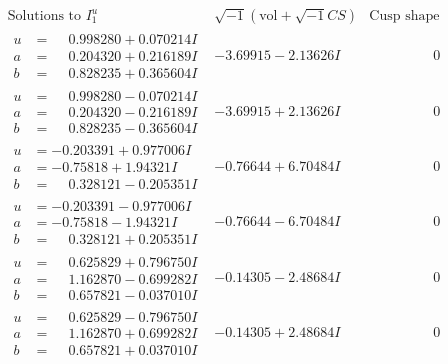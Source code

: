 \documentclass[1p]{elsarticle_modified}
\theoremstyle{definition}
\newcommand{\I}{\sqrt{-1}}
\begin{document}
$$\begin{array}{c|c|c}  
\text{Solutions to }I^u_{1}& \I (\text{vol} + \sqrt{-1}CS) & \text{Cusp shape}\\
 \hline 
\begin{aligned}
u &= \phantom{-}0.998280 + 0.070214 I \\
a &= \phantom{-}0.204320 + 0.216189 I \\
b &= \phantom{-}0.828235 + 0.365604 I\end{aligned}
 & -3.69915 - 2.13626 I & \phantom{-0.000000 } 0 \\ \hline\begin{aligned}
u &= \phantom{-}0.998280 - 0.070214 I \\
a &= \phantom{-}0.204320 - 0.216189 I \\
b &= \phantom{-}0.828235 - 0.365604 I\end{aligned}
 & -3.69915 + 2.13626 I & \phantom{-0.000000 } 0 \\ \hline\begin{aligned}
u &= -0.203391 + 0.977006 I \\
a &= -0.75818 + 1.94321 I \\
b &= \phantom{-}0.328121 - 0.205351 I\end{aligned}
 & -0.76644 + 6.70484 I & \phantom{-0.000000 } 0 \\ \hline\begin{aligned}
u &= -0.203391 - 0.977006 I \\
a &= -0.75818 - 1.94321 I \\
b &= \phantom{-}0.328121 + 0.205351 I\end{aligned}
 & -0.76644 - 6.70484 I & \phantom{-0.000000 } 0 \\ \hline\begin{aligned}
u &= \phantom{-}0.625829 + 0.796750 I \\
a &= \phantom{-}1.162870 - 0.699282 I \\
b &= \phantom{-}0.657821 - 0.037010 I\end{aligned}
 & -0.14305 - 2.48684 I & \phantom{-0.000000 } 0 \\ \hline\begin{aligned}
u &= \phantom{-}0.625829 - 0.796750 I \\
a &= \phantom{-}1.162870 + 0.699282 I \\
b &= \phantom{-}0.657821 + 0.037010 I\end{aligned}
 & -0.14305 + 2.48684 I & \phantom{-0.000000 } 0 \\ \hline\begin{aligned}

\end{aligned}
\end{array}$$
\end{document}
